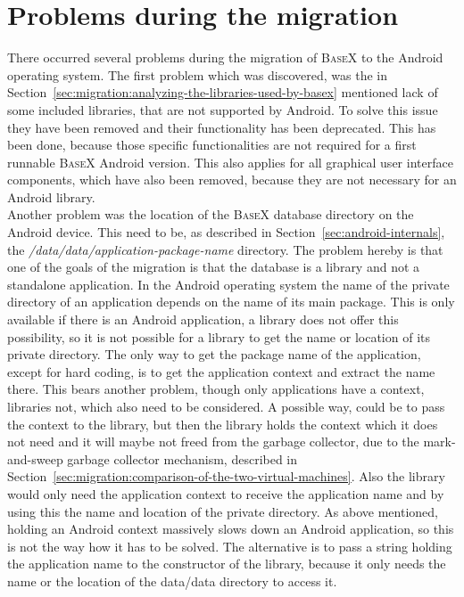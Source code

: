 \section{Problems during the migration}
\label{sec:migration:problems-during-the-migration}
There occurred several problems during the migration of \textsc{BaseX} to the Android operating system.
The first problem which was discovered, was the in Section~\ref{sec:migration:analyzing-the-libraries-used-by-basex} mentioned lack of some included libraries, that are not supported by Android.
To solve this issue they have been removed and their functionality has been deprecated.
This has been done, because those specific functionalities are not required for a first runnable \textsc{BaseX} Android version.
This also applies for all graphical user interface components, which have also been removed, because they are not necessary for an Android library.\\
Another problem was the location of the \textsc{BaseX} database directory on the Android device.
This need to be, as described in Section~\ref{sec:android-internals}, the \textit{/data/data/app\-lication-package-name} directory.
The problem hereby is that one of the goals of the migration is that the database is a library and not a standalone application.
In the Android operating system the name of the private directory of an application depends on the name of its main package.
This is only available if there is an Android application, a library does not offer this possibility, so it is not possible for a library to get the name or location of its private directory.
The only way to get the package name of the application, except for hard coding, is to get the application context and extract the name there.
This bears another problem, though only applications have a context, libraries not, which also need to be considered. 
A possible way, could be to pass the context to the library, but then the library holds the context which it does not need and it will maybe not freed from the garbage collector, due to the mark-and-sweep garbage collector mechanism, described in Section~\ref{sec:migration:comparison-of-the-two-virtual-machines}.
Also the library would only need the application context to receive the application name and by using this the name and location of the private directory.
As above mentioned, holding an Android context massively slows down an Android application, so this is not the way how it has to be solved.
The alternative is to pass a string holding the application name to the constructor of the library, because it only needs the name or the location of the data/data directory to access it.
